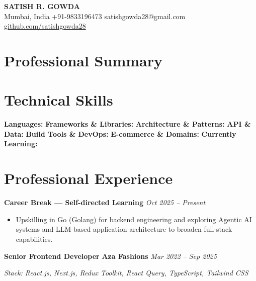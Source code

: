 \documentclass[10pt, a4paper]{article}
\begin{document}
{\Huge\bfseries SATISH R. GOWDA}\\[4pt]
Mumbai, India \textbar{} +91-9833196473 \textbar{} satishgowda28@gmail.com \textbar{} \href{https://github.com/satishgowda28}{github.com/satishgowda28}

\section{Professional Summary}


\section{Technical Skills}

\textbf{Languages:} %
\textbf{Frameworks \& Libraries:} %
\textbf{Architecture \& Patterns:} %
\textbf{API \& Data:} %
\textbf{Build Tools \& DevOps:} %
\textbf{E-commerce \& Domains:} %
\textbf{Currently Learning:} %

\section{Professional Experience}

\textbf{Career Break --- Self-directed Learning} \hfill \textit{Oct 2025 -- Present}
\begin{itemize}
  \item Upskilling in Go (Golang) for backend engineering and exploring Agentic AI systems and LLM-based application architecture to broaden full-stack capabilities.
\end{itemize}

\medskip

\textbf{Senior Frontend Developer} \textbar{} \textbf{Aza Fashions} \hfill \textit{Mar 2022 -- Sep 2025}
\begin{itemize}
\end{itemize}
\textit{Stack: React.js, Next.js, Redux Toolkit, React Query, TypeScript, Tailwind CSS}
\end{document}
